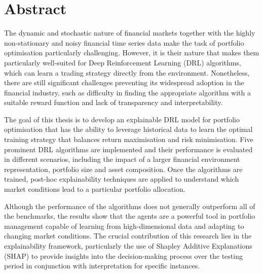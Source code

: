 \chapter*{Abstract}

The dynamic and stochastic nature of financial markets together with the highly non-stationary and noisy financial time series data make the task of portfolio optimisation particularly challenging. However, it is their nature that makes them particularly well-suited for Deep Reinforcement Learning (DRL) algorithms, which can learn a trading strategy directly from the environment. Nonetheless, there are still significant challenges preventing its widespread adoption in the financial industry, such as difficulty in finding the appropriate algorithm with a suitable reward function and lack of transparency and interpretability. 

The goal of this thesis is to develop an explainable DRL model for portfolio optimisation that has the ability to leverage historical data to learn the optimal training strategy that balances return maximisation and risk minimisation. Five prominent DRL algorithms are implemented and their performance is evaluated in different scenarios, including the impact of a larger financial environment representation, portfolio size and asset composition. Once the algorithms are trained, post-hoc explainability techniques are applied to understand which market conditions lead to a particular portfolio allocation.

Although the performance of the algorithms does not generally outperform all of the benchmarks, the results show that the agents are a powerful tool in portfolio management capable of learning from high-dimensional data and adapting to changing market conditions. The crucial contribution of this research lies in the explainability framework, particularly the use of Shapley Additive Explanations (SHAP) to provide insights into the decision-making process over the testing period in conjunction with interpretation for specific instances.  
